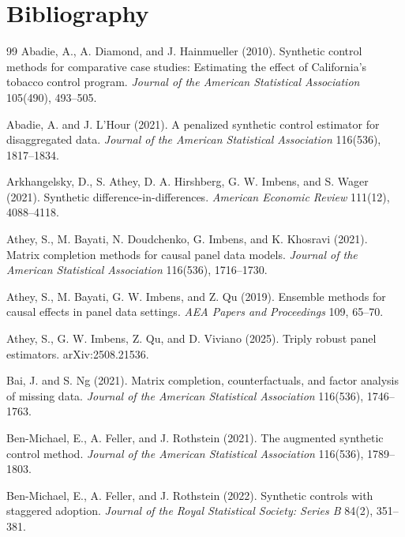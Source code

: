 \documentclass[11pt]{article}
\theoremstyle{definition}
\theoremstyle{plain}
\theoremstyle{remark}
\begin{document}
\section*{Bibliography}
\begin{thebibliography}{99}
Abadie, A., A. Diamond, and J. Hainmueller (2010).
Synthetic control methods for comparative case studies: Estimating the effect
of California's tobacco control program.
\emph{Journal of the American Statistical Association} 105(490), 493--505.

Abadie, A. and J. L'Hour (2021).
A penalized synthetic control estimator for disaggregated data.
\emph{Journal of the American Statistical Association} 116(536), 1817--1834.

Arkhangelsky, D., S. Athey, D. A. Hirshberg, G. W. Imbens, and S. Wager
(2021). Synthetic difference-in-differences.
\emph{American Economic Review} 111(12), 4088--4118.

Athey, S., M. Bayati, N. Doudchenko, G. Imbens, and K. Khosravi (2021).
Matrix completion methods for causal panel data models.
\emph{Journal of the American Statistical Association} 116(536), 1716--1730.

Athey, S., M. Bayati, G. W. Imbens, and Z. Qu (2019).
Ensemble methods for causal effects in panel data settings.
\emph{AEA Papers and Proceedings} 109, 65--70.

Athey, S., G. W. Imbens, Z. Qu, and D. Viviano (2025).
Triply robust panel estimators.
arXiv:2508.21536.

Bai, J. and S. Ng (2021).
Matrix completion, counterfactuals, and factor analysis of missing data.
\emph{Journal of the American Statistical Association} 116(536), 1746--1763.

Ben-Michael, E., A. Feller, and J. Rothstein (2021).
The augmented synthetic control method.
\emph{Journal of the American Statistical Association} 116(536), 1789--1803.

Ben-Michael, E., A. Feller, and J. Rothstein (2022).
Synthetic controls with staggered adoption.
\emph{Journal of the Royal Statistical Society: Series B} 84(2), 351--381.


\end{thebibliography}
\end{document}
